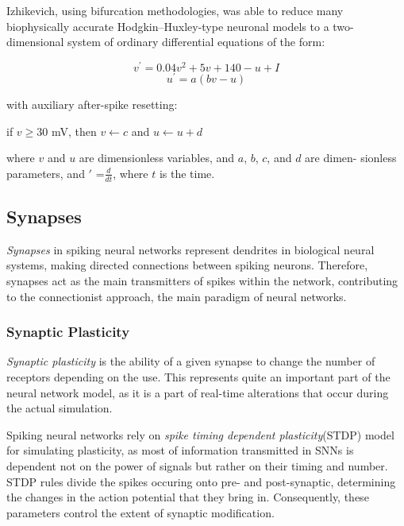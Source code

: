 \begin{itemize}
Izhikevich, using bifurcation methodologies\cite{Izhikevich2007}, was able to reduce many biophysically accurate Hodgkin–Huxley-type neuronal models to a two-dimensional system of ordinary differential equations of the form:

\begin{center}
\begin{equation}v^\prime = 0.04v^2 + 5v + 140 - u + I \end{equation}
\begin{equation}u^\prime = a(bv-u)\end{equation}
\end{center}

with auxiliary after-spike resetting:

\begin{center}
if $v \geq 30$ mV, then $v \leftarrow c$ and $ u \leftarrow u + d$
\end{center}

where $v$ and $u$ are dimensionless variables, and $a$, $b$, $c$, and $d$ are dimen-
sionless parameters, and $\prime$ =$\frac{d}{dt}$, where $t$ is the time.


\end{itemize}

\subsection{Synapses}

\emph{Synapses} in spiking neural networks represent dendrites in biological neural systems, making directed connections between spiking neurons. 
Therefore, synapses act as the main transmitters of spikes within the network, contributing to the connectionist approach, the main paradigm of neural networks.

\subsubsection{Synaptic Plasticity}

\emph{Synaptic plasticity} is the ability of a given synapse to change the number of receptors depending on the use.\cite{WulframGerstner2002} This represents quite an
important part of the neural network model, as it is a part of real-time alterations that occur during the actual simulation.

Spiking neural networks rely on \emph{spike timing dependent plasticity}(STDP) model for simulating plasticity, as most of information transmitted in SNNs is dependent not on 
the power of signals but rather on their timing and number. STDP rules divide the spikes occuring onto pre- and post-synaptic, determining the changes in the action potential that
they bring in. Consequently, these parameters control the extent of synaptic modification.\cite{SenSong2000}

